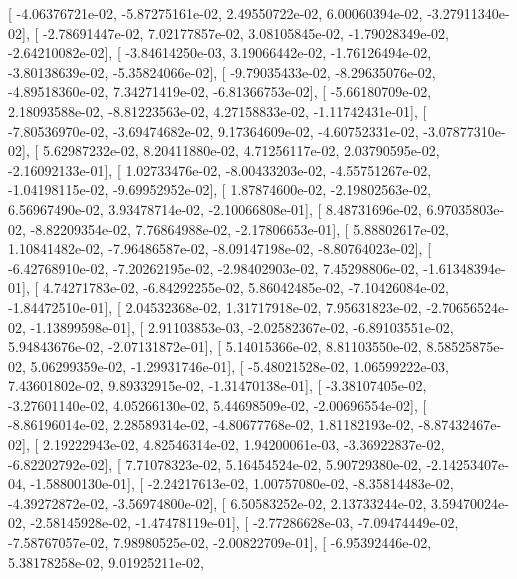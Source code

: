 \documentclass{article}
\begin{document}
       [ -4.06376721e-02,  -5.87275161e-02,   2.49550722e-02,
          6.00060394e-02,  -3.27911340e-02],
       [ -2.78691447e-02,   7.02177857e-02,   3.08105845e-02,
         -1.79028349e-02,  -2.64210082e-02],
       [ -3.84614250e-03,   3.19066442e-02,  -1.76126494e-02,
         -3.80138639e-02,  -5.35824066e-02],
       [ -9.79035433e-02,  -8.29635076e-02,  -4.89518360e-02,
          7.34271419e-02,  -6.81366753e-02],
       [ -5.66180709e-02,   2.18093588e-02,  -8.81223563e-02,
          4.27158833e-02,  -1.11742431e-01],
       [ -7.80536970e-02,  -3.69474682e-02,   9.17364609e-02,
         -4.60752331e-02,  -3.07877310e-02],
       [  5.62987232e-02,   8.20411880e-02,   4.71256117e-02,
          2.03790595e-02,  -2.16092133e-01],
       [  1.02733476e-02,  -8.00433203e-02,  -4.55751267e-02,
         -1.04198115e-02,  -9.69952952e-02],
       [  1.87874600e-02,  -2.19802563e-02,   6.56967490e-02,
          3.93478714e-02,  -2.10066808e-01],
       [  8.48731696e-02,   6.97035803e-02,  -8.82209354e-02,
          7.76864988e-02,  -2.17806653e-01],
       [  5.88802617e-02,   1.10841482e-02,  -7.96486587e-02,
         -8.09147198e-02,  -8.80764023e-02],
       [ -6.42768910e-02,  -7.20262195e-02,  -2.98402903e-02,
          7.45298806e-02,  -1.61348394e-01],
       [  4.74271783e-02,  -6.84292255e-02,   5.86042485e-02,
         -7.10426084e-02,  -1.84472510e-01],
       [  2.04532368e-02,   1.31717918e-02,   7.95631823e-02,
         -2.70656524e-02,  -1.13899598e-01],
       [  2.91103853e-03,  -2.02582367e-02,  -6.89103551e-02,
          5.94843676e-02,  -2.07131872e-01],
       [  5.14015366e-02,   8.81103550e-02,   8.58525875e-02,
          5.06299359e-02,  -1.29931746e-01],
       [ -5.48021528e-02,   1.06599222e-03,   7.43601802e-02,
          9.89332915e-02,  -1.31470138e-01],
       [ -3.38107405e-02,  -3.27601140e-02,   4.05266130e-02,
          5.44698509e-02,  -2.00696554e-02],
       [ -8.86196014e-02,   2.28589314e-02,  -4.80677768e-02,
          1.81182193e-02,  -8.87432467e-02],
       [  2.19222943e-02,   4.82546314e-02,   1.94200061e-03,
         -3.36922837e-02,  -6.82202792e-02],
       [  7.71078323e-02,   5.16454524e-02,   5.90729380e-02,
         -2.14253407e-04,  -1.58800130e-01],
       [ -2.24217613e-02,   1.00757080e-02,  -8.35814483e-02,
         -4.39272872e-02,  -3.56974800e-02],
       [  6.50583252e-02,   2.13733244e-02,   3.59470024e-02,
         -2.58145928e-02,  -1.47478119e-01],
       [ -2.77286628e-03,  -7.09474449e-02,  -7.58767057e-02,
          7.98980525e-02,  -2.00822709e-01],
       [ -6.95392446e-02,   5.38178258e-02,   9.01925211e-02,
\end{document}
